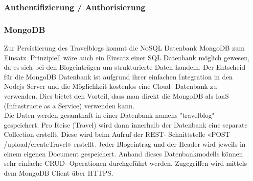 \documentclass[../main.tex]{subfiles}
\begin{document}
\subsubsection{Authentifizierung / Authorisierung}


\subsubsection{MongoDB}
Zur Persistierung des Travelblogs kommt die NoSQL Datenbank MongoDB zum Einsatz. Prinzipiell wäre auch ein Einsatz einer SQL Datenbank möglich gewesen, da es sich bei den Blogeinträgen um strukturierte Daten handeln. Der Entscheid für die MongoDB Datenbank ist aufgrund ihrer einfachen Integration in den Nodejs Server und die Möglichkeit kostenlos eine Cloud- Datenbank zu verwenden. Dies bietet den Vorteil, dass man direkt die MongoDB als IaaS (Infrastructe as a Service) verwenden kann.\\
Die Daten werden gesamthaft in einer Datenbank namens "travelblog" gespeichert. Pro Reise (Travel) wird dann innerhalb der Datenbank eine separate Collection erstellt. Diese wird beim Aufruf der REST- Schnittstelle «POST /upload/createTravel» erstellt. Jeder Blogeintrag und der Header wird jeweils in einem eigenen Document gespeichert. Anhand dieses Datenbankmodells können sehr einfache CRUD- Operationen durchgeführt werden. Zugegriffen wird mittels dem MongoDB Client über HTTPS.
\end{document}
